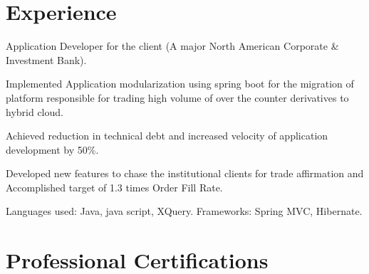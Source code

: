 \documentclass[letterpaper]{deedy-resume} %
\begin{document}
\hfill
%
%
\begin{minipage}[t]{0.66\textwidth} %


\section{Experience}


\vspace{\topsep} %
\begin{tightitemize}
\item Application Developer for the client (A major North American Corporate \& Investment Bank).
\item Implemented Application modularization using spring boot for the migration of platform responsible for trading high volume of over the counter derivatives to hybrid cloud.
\item Achieved reduction in technical debt and increased velocity of application development by 50\%.
\item Developed new features to chase the institutional clients for trade affirmation and Accomplished target of 1.3 times Order Fill Rate.
\item Languages used: Java, java script, XQuery. Frameworks: Spring MVC, Hibernate.
\end{tightitemize}


\sectionspace %

\section{Professional Certifications}

 \\


\end{minipage}
\end{document}

